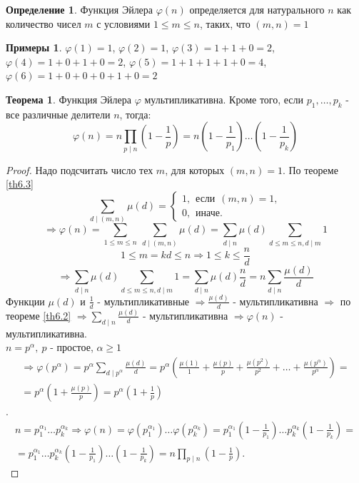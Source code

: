 \documentclass[a4paper, 12pt]{article}
\renewcommand{\phi}{\varphi}
\renewcommand{\div}{\mid}
\theoremstyle{definition}
\newtheorem{definition}{Определение}[section]
\newtheorem{theorem}{Теорема}[section]
\newtheorem*{example}{Примеры}
\begin{document}
    \begin{definition}
        Функция Эйлера $\phi(n)$ определяется для натурального $n$ как количество чисел $m$ с условиями $1\leq m\leq n$, таких, что $(m,n)=1$
    \end{definition}
    \begin{example}
        $\phi(1)=1$, $\phi(2)=1$, $\phi(3)=1+1+0=2$, $\phi(4)=1+0+1+0=2$, $\phi(5)=1+1+1+1+0=4$, $\phi(6)=1+0+0+0+1+0=2$
    \end{example}
    \begin{theorem}
        Функция Эйлера $\phi$ мультипликативна. Кроме того, если $p_1,\dots,p_k$ - все различные делители $n$, тогда:
        \[\phi(n)=n\prod\limits_{p\div n}(1-\frac{1}{p})=n(1-\frac{1}{p_1})\dots(1-\frac{1}{p_k})\]
    \end{theorem} 
    \begin{proof}
        Надо подсчитать число тех $m$, для которых $(m,n)=1$. По теореме \ref{th6.3}
        \[\sum\limits_{d\div (m,n)}\mu(d)=\begin{cases}
            1, \hspace{5pt} \text{если} \hspace{5pt} (m,n)=1,\\
            0, \hspace{5pt} \text{иначе}.
        \end{cases}\]
        \[\Rightarrow \phi(n)=\sum\limits_{1\leq m\leq n}\ \sum\limits_{d\div (m,n)}\mu(d)=\sum_{d\div n}\mu(d)\sum\limits_{d\leq m\leq n, d\div m}1\]
        \[1\leq m=kd\leq n \Rightarrow 1\leq k\leq \frac{n}{d}\]
        \[\Rightarrow \sum_{d\div n}\mu(d)\sum\limits_{d\leq m\leq n, d\div m}1 =\sum\limits_{d\div n}\mu(d)\frac{n}{d}=n\sum\limits_{d\div n}\frac{\mu(d)}{d}\] Функции $\mu(d)$ и $\frac{1}{d}$ - мультипликативные $\Rightarrow \frac{\mu(d)}{d}$ - мультипликативна $\Rightarrow$ по теореме \ref{th6.2} $\Rightarrow \sum\limits_{d\div n}\frac{\mu(d)}{d}$ - мультипликативна $\Rightarrow \phi(n)$ - мультипликативна.\\
        $n=p^{\alpha},\ p$ - простое, $\alpha\geq 1$
        \begin{multline*}
            \Rightarrow \phi(p^{\alpha})=p^{\alpha}\sum\limits_{d \div p^{\alpha}}\frac{\mu(d)}{d}=p^{\alpha}(\frac{\mu(1)}{1}+\frac{\mu(p)}{p}+\frac{\mu(p^2)}{p^2}+\dots+\frac{\mu(p^{\alpha})}{p^{\alpha}})=\\
            =p^{\alpha}(1+\frac{\mu(p)}{p})=p^{\alpha}(1+\frac{1}{p})
        \end{multline*}.
        \begin{multline*}
            n=p_1^{\alpha_1}\dots p_k^{\alpha_k}\Rightarrow \phi(n)=\phi(p_1^{\alpha_1})\dots \phi(p_k^{\alpha_k})=p_1^{\alpha_1}(1-\frac{1}{p_1})\dots p_k^{\alpha_k}(1-\frac{1}{p_k})=\\
            =p_1^{\alpha_1}\dots p_k^{\alpha_k}(1-\frac{1}{p_1})\dots (1-\frac{1}{p_k})=n\prod\limits_{p\div n}(1-\frac{1}{p}).
        \end{multline*}
    \end{proof}
\end{document}
